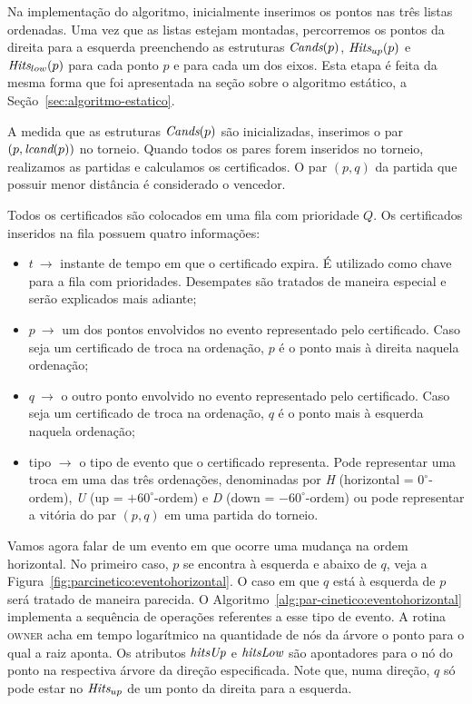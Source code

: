 Na implementação do algoritmo, inicialmente inserimos os pontos nas três listas ordenadas.
Uma vez que as listas estejam montadas, percorremos os pontos da direita para a esquerda
preenchendo as estruturas $\textit{Cands}(p)$, $\textit{Hits}_{up}(p)$ e $\textit{Hits}_{low}(p)$ para cada ponto $p$ e
para cada um dos eixos.
Esta etapa é feita da mesma forma que foi apresentada na seção sobre o algoritmo estático, a
Seção~\ref{sec:algoritmo-estatico}.

A medida que as estruturas $\textit{Cands}(p)$ são inicializadas, inserimos o par $(p, \textit{lcand}(p))$ no
torneio.
Quando todos os pares forem inseridos no torneio, realizamos as partidas e calculamos os
certificados.
O par $(p, q)$ da partida que possuir menor distância é considerado o vencedor.

Todos os certificados são colocados em uma fila com prioridade $Q$.
Os certificados inseridos na fila possuem quatro informações:
\begin{itemize}
    \item $t~\rightarrow$ instante de tempo em que o certificado
    expira.
    É utilizado como chave para a fila com prioridades.
    Desempates são tratados de maneira especial e serão explicados
    mais adiante;
    \item $p~\rightarrow$ um dos pontos envolvidos no evento
    representado pelo certificado.
    Caso seja um certificado de troca na ordenação, $p$ é o ponto mais à direita naquela ordenação;
    \item $q~\rightarrow$ o outro ponto envolvido no evento representado pelo certificado.
    Caso seja um certificado de troca na ordenação, $q$ é o ponto mais à esquerda naquela
    ordenação;
    \item tipo $ \rightarrow$ o tipo de evento que o certificado representa.
    Pode representar uma troca em uma das três ordenações, denominadas por \textit{H} (horizontal =
    $0^\circ$-ordem), \textit{U} (up = $+60^\circ$-ordem) e \textit{D} (down = $-60^\circ$-ordem) ou pode
    representar a vitória do par $(p, q)$ em uma partida do torneio.
\end{itemize}



Vamos agora falar de um evento em que ocorre uma mudança na ordem horizontal.
No primeiro caso, $p$ se encontra à esquerda e abaixo de $q$, veja a
Figura~\ref{fig:parcinetico:eventohorizontal}.
O caso em que $q$ está à esquerda de $p$ será tratado de maneira parecida.
O Algoritmo~\ref{alg:par-cinetico:eventohorizontal} implementa a sequência de operações referentes
a esse tipo de evento.
A rotina \textsc{owner} acha em tempo logarítmico na quantidade de nós da árvore o ponto para o
qual a raiz aponta.
Os atributos $\textit{hitsUp}$ e $\textit{hitsLow}$ são apontadores para o nó do ponto na respectiva árvore da
direção especificada.
Note que, numa direção, $q$ só pode estar no $\textit{Hits}_{up}$ de um ponto da direita para a esquerda.

